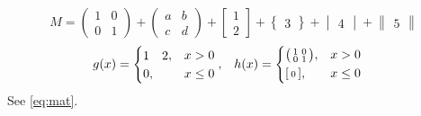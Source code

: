 \documentclass{article}
\begin{document}
\begin{equation}\label{eq:mat}
M = \left(\begin{array}{cc} 1 & 0 \\ 0 & 1 \end{array}\right)
+ \begin{pmatrix} a & b \\ c & d \end{pmatrix}
+ \begin{bmatrix} 1 \\ 2 \end{bmatrix}
+ \begin{Bmatrix} 3 \end{Bmatrix}
+ \begin{vmatrix} 4 \end{vmatrix}
+ \begin{Vmatrix} 5 \end{Vmatrix}
\end{equation}
\begin{align*}
g(x) &= \begin{cases} \begin{matrix} 1 & 2 \end{matrix}, & x > 0 \\ 0, & x \le 0 \end{cases}, &
h(x) &= \begin{dcases} \bigl(\begin{smallmatrix} 1 & 0 \\ 0 & 1 \end{smallmatrix}\bigr), & x > 0 \\ \begin{bsmallmatrix} 0 \end{bsmallmatrix}, & x \le 0 \end{dcases}
\end{align*}
See \eqref{eq:mat}.
\end{document}
